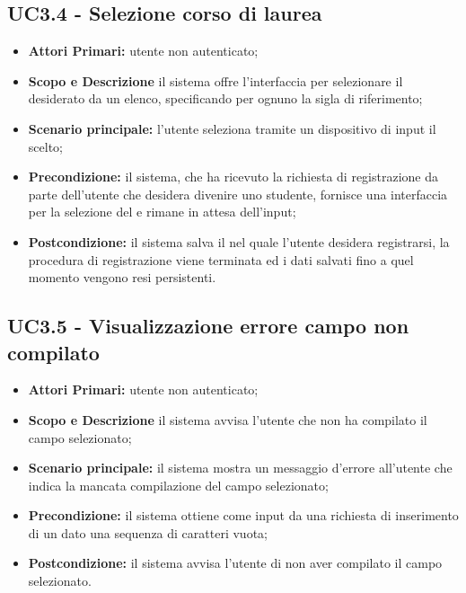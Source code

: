 \documentclass[AnalisiDeiRequisiti.tex]{subfiles}
\begin{document}
\subsection{UC3.4 - Selezione corso di laurea}
\begin{itemize}
	\item \textbf{Attori Primari:} utente non autenticato;
	\item \textbf{Scopo e Descrizione} il sistema offre l'interfaccia per selezionare il  desiderato da un elenco, specificando per ognuno la sigla di riferimento;
	\item \textbf{Scenario principale:} l'utente seleziona tramite un dispositivo di input il  scelto;
	\item \textbf{Precondizione:} il sistema, che ha ricevuto la richiesta di registrazione da parte dell'utente che desidera divenire uno studente, fornisce una interfaccia per la selezione del  e rimane in attesa dell'input;
	\item \textbf{Postcondizione:} il sistema salva il  nel quale l'utente desidera registrarsi, la procedura di registrazione viene terminata ed i dati salvati fino a quel momento vengono resi persistenti.
\end{itemize}

\subsection{UC3.5 - Visualizzazione errore campo non compilato}
\begin{itemize}
	\item \textbf{Attori Primari:} utente non autenticato;
	\item \textbf{Scopo e Descrizione} il sistema avvisa l'utente che non ha compilato il campo selezionato;
	\item \textbf{Scenario principale:} il sistema mostra un messaggio d'errore all'utente che indica la mancata compilazione del campo selezionato;
	\item \textbf{Precondizione:} il sistema ottiene come input da una richiesta di inserimento di un dato una sequenza di caratteri vuota;
	\item \textbf{Postcondizione:} il sistema avvisa l'utente di non aver compilato il campo selezionato.
\end{itemize}
\end{document}
